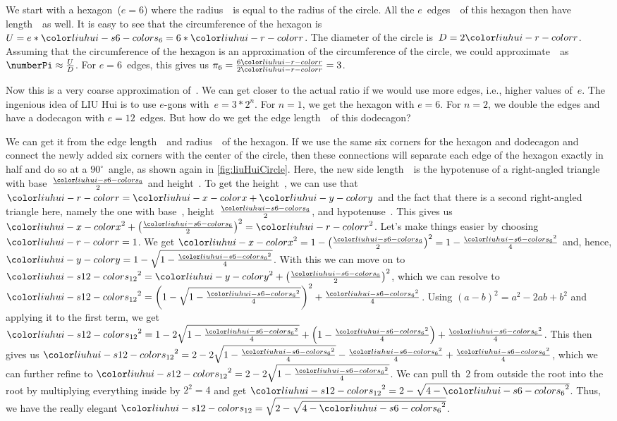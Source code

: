 We start with a hexagon~($e=6$) where the radius~\liuhuir\ is equal to the radius of the circle.
All the $e$~edges~\liuhuiss\ of this hexagon then have length~\liuhuir\ as well.
It is easy to see that the circumference of the hexagon is~$U=e*\liuhuiss=6*\liuhuir$.
The diameter of the circle is~$D=2\liuhuir$.
Assuming that the circumference of the hexagon is an approximation of the circumference of the circle, we could approximate~\numberPi\ as $\numberPi\approx\frac{U}{D}$.
For $e=6$~edges, this gives us $\pi_6=\frac{6\liuhuir}{2\liuhuir}=3$.

Now this is a very coarse approximation of~\numberPi.
We can get closer to the actual ratio if we would use more edges, i.e., higher values of~$e$.
The ingenious idea of LIU Hui is to use $e$\nobreakdashes-gons with~$e=3*2^n$.
For $n=1$, we get the hexagon with $e=6$.
For $n=2$, we double the edges and have a dodecagon with $e=12$~edges.
But how do we get the edge length~\liuhuist\ of this dodecagon?

We can get it from the edge length~\liuhuiss\ and radius~\liuhuir\ of the hexagon.
If we use the same six corners for the hexagon and dodecagon and connect the newly added six corners with the center of the circle, then these connections will separate each edge of the hexagon exactly in half and do so at a $90^\circ$~angle, as shown again in \cref{fig:liuHuiCircle}.
Here, the new side length~\liuhuist\ is the hypotenuse of a right-angled triangle with base~$\frac{\liuhuiss}{2}$ and height~\liuhuiy.
To get the height~\liuhuiy, we can use that~$\liuhuir=\liuhuix+\liuhuiy$ and the fact that there is a second right-angled triangle here, namely the one with base~\liuhuix, height~$\frac{\liuhuiss}{2}$, and hypotenuse~\liuhuir.
This gives us $\liuhuix^2+\left(\frac{\liuhuiss}{2}\right)^2=\liuhuir^2$.
Let's make things easier by choosing~$\liuhuir=1$.
We get $\liuhuix^2=1-\left(\frac{\liuhuiss}{2}\right)^2=1-\frac{\liuhuiss^2}{4}$ and, hence, $\liuhuiy=1-\sqrt{1-\frac{\liuhuiss^2}{4}}$.
With this we can move on to $\liuhuist^2=\liuhuiy^2+\left(\frac{\liuhuiss}{2}\right)^2$, which we can resolve to $\liuhuist^2=\left(1-\sqrt{1-\frac{\liuhuiss^2}{4}}\right)^2+\frac{\liuhuiss^2}{4}$.
Using $(a-b)^2=a^2-2ab+b^2$ and applying it to the first term, we get $\liuhuist^2=1-2\sqrt{1-\frac{\liuhuiss^2}{4}}+\left(1-\frac{\liuhuiss^2}{4}\right)+\frac{\liuhuiss^2}{4}$.
This then gives us $\liuhuist^2=2-2\sqrt{1-\frac{\liuhuiss^2}{4}}-\frac{\liuhuiss^2}{4}+\frac{\liuhuiss^2}{4}$, which we can further refine to $\liuhuist^2=2-2\sqrt{1-\frac{\liuhuiss^2}{4}}$.
We can pull th~$2$ from outside the root into the root by multiplying everything inside by $2^2=4$ and get $\liuhuist^2=2-\sqrt{4-\liuhuiss^2}$.
Thus, we have the really elegant $\liuhuist=\sqrt{2-\sqrt{4-\liuhuiss^2}}$.


